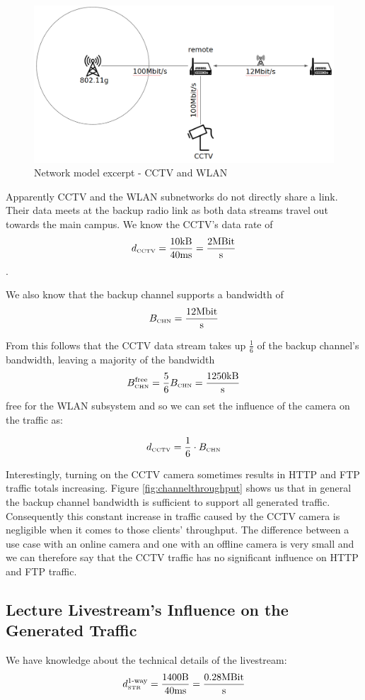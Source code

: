 \documentclass[a4paper]{scrreprt}
\begin{document}
			\begin{figure}[H]
				\center\includegraphics[width=\textwidth]{./simmodel_cctv_vs_wlan.png}
				\caption{Network model excerpt - CCTV and WLAN}
			\end{figure}
			
			Apparently CCTV and the WLAN subnetworks do not directly share a link. Their data meets at the backup radio link as both data streams travel out towards the main campus. We know the CCTV's data rate of  
			\[d_\text{\tiny CCTV}=\frac{10\text{kB}}{40\text{ms}}=\frac{2\text{MBit}}{\text{s}}\]. 
			
			We also know that the backup channel supports a bandwidth of \[B_\text{\tiny CHN}=\frac{12\text{Mbit}}{\text{s}}\]
			
			From this follows that the CCTV data stream takes up $\frac{1}{6}$ of the backup channel's bandwidth, leaving a majority of the bandwidth \[B_\text{\tiny CHN}^\text{free}=\frac{5}{6} B_\text{\tiny CHN}=\frac{1250\text{kB}}{\text{s}}\] free for the WLAN subsystem and so we can set the influence of the camera on the traffic as:
			
			\[d_\text{\tiny CCTV}=\frac{1}{6}\cdot B_\text{\tiny CHN}\]
			
			Interestingly, turning on the CCTV camera sometimes results in HTTP and FTP traffic totals increasing. Figure \ref{fig:channelthroughput} shows us that in general the backup channel bandwidth is sufficient to support all generated traffic. Consequently this constant increase in traffic caused by the CCTV camera is negligible when it comes to those clients' throughput. The difference between a use case with an online camera and one with an offline camera is very small and we can therefore say that the CCTV traffic has no significant influence on HTTP and FTP traffic.
		
			\subsection{Lecture Livestream's Influence on the Generated Traffic}
			We have knowledge about the technical details of the livestream: 
		\[d_\text{\tiny STR}^\text{1-way}=\frac{1400\text{B}}{40\text{ms}}=\frac{0.28\text{MBit}}{\text{s}}\]
		
\end{document}
